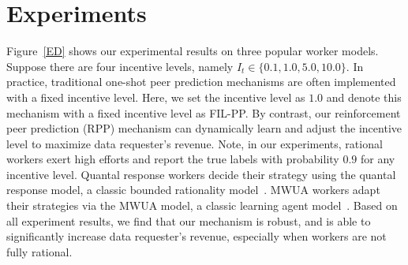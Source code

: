 \documentclass[letterpaper]{article} %
\begin{document}
\section{Experiments}
Figure~\ref{ED} 
shows our experimental results on three popular worker models.
Suppose there are four incentive levels, namely $I_t\in \{0.1, 1.0, 5.0, 10.0\}$.
In practice, traditional one-shot peer prediction mechanisms are often implemented with a fixed incentive level.
Here, we set the incentive level as $1.0$ and denote this mechanism with a fixed incentive level as FIL-PP.
By contrast, our reinforcement peer prediction (RPP) mechanism can dynamically learn and adjust the incentive level to maximize data requester's revenue.
Note, in our experiments, rational workers exert  high efforts and report the true labels with probability $0.9$ for any incentive level.
Quantal response workers decide their strategy using the quantal response model, a classic bounded rationality model~\cite{mckelvey1995quantal}.
MWUA workers adapt their strategies via the MWUA model, a classic learning agent model~\cite{chastain2014algorithms}.
Based on all experiment results, we find that our mechanism is robust, and is able to significantly increase data requester's revenue, especially when workers are not fully rational.



\end{document}
